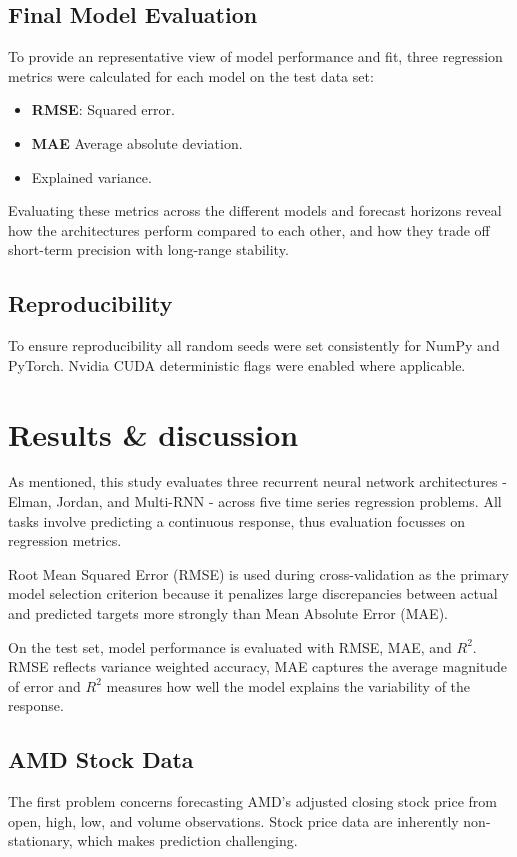 \documentclass[conference]{IEEEtran}
\begin{document}
\subsection{\textbf{Final Model Evaluation}}
To provide an representative view of model performance and fit, three regression metrics were calculated for each model on the test data set:
\begin{itemize}
    \item \textbf{RMSE}: Squared error.
    \item \textbf{MAE} Average absolute deviation.
    \item {} Explained variance.
\end{itemize}
Evaluating these metrics across the different models and forecast horizons reveal how the architectures perform compared to each other, and how they trade off short-term precision with long-range stability.

\subsection{\textbf{Reproducibility}}
To ensure reproducibility all random seeds were set consistently for NumPy and PyTorch. Nvidia CUDA deterministic flags were enabled where applicable.

\section{\textbf{Results \& discussion}}
As mentioned, this study evaluates three recurrent neural network architectures - Elman, Jordan, and Multi-RNN - across five time series regression problems. All tasks involve predicting a continuous response, thus evaluation focusses on regression metrics.

Root Mean Squared Error (RMSE) is used during cross-validation as the primary model selection criterion because it penalizes large discrepancies between actual and predicted targets more strongly than Mean Absolute Error (MAE).

On the test set, model performance is evaluated with RMSE, MAE, and $R^2$. RMSE reflects variance weighted accuracy, MAE captures the average magnitude of error and $R^2$ measures how well the model explains the variability of the response.

\subsection{\textbf{AMD Stock Data}}
The first problem concerns forecasting AMD's adjusted closing stock price from open, high, low, and volume observations. Stock price data are inherently non-stationary, which makes prediction challenging.
\end{document}

